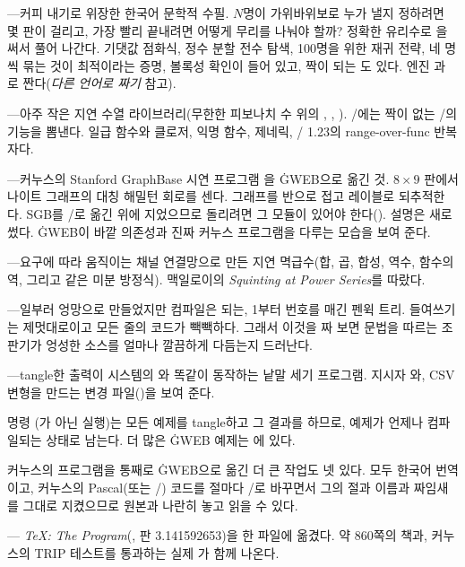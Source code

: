 \bull {}---커피 내기로 위장한 한국어 문학적 수필. $N$명이 가위바위보로
누가 낼지 정하려면 몇 판이 걸리고, 가장 빨리 끝내려면 어떻게 무리를 나눠야
할까? 정확한 유리수로 을 써서 풀어 나간다. 기댓값 점화식, 정수
분할 전수 탐색, 100명을 위한 재귀 전략, 네 명씩 묶는 것이 최적이라는 증명,
볼록성 확인이 들어 있고, 짝이 되는 도 있다. 엔진 과
로 짠다({\it 다른 언어로 짜기\/} 참고).

\bull {}---아주 작은 지연 수열 라이브러리(무한한 피보나치 수 위의
, , ). \CEE/에는 짝이 없는 \GO/의 기능을 뽐낸다.
일급 함수와 클로저, 익명 함수, 제네릭, \GO/ 1.23의 range-over-func
반복자다.

\bull {}---커누스의 Stanford GraphBase 시연 프로그램 을
\.{GWEB}으로 옮긴 것. $8\times9$ 판에서 나이트 그래프의 대칭 해밀턴 회로를
센다. 그래프를 반으로 접고  레이블로 되추적한다. SGB를 \GO/로 옮긴
 위에 지었으므로 돌리려면 그
모듈이 있어야 한다(). 설명은 새로 썼다.
\.{GWEB}이 바깥 의존성과 진짜 커누스 프로그램을 다루는 모습을 보여 준다.

\bull {}---요구에 따라 움직이는 채널 연결망으로 만든 지연 멱급수(합,
곱, 합성, 역수, 함수의 역, 그리고  같은 미분 방정식). 맥일로이의
{\it Squinting at Power Series\/}를 따랐다.

\bull {}---일부러 엉망으로 만들었지만 컴파일은 되는, 1부터
번호를 매긴 펜윅 트리. 들여쓰기는 제멋대로이고 모든 줄의 코드가 빽빽하다.
그래서 이것을 짜 보면 문법을 따르는 조판기가 엉성한 소스를 얼마나 깔끔하게
다듬는지 드러난다.

\bull {}---tangle한 출력이 시스템의 와 똑같이 동작하는 낱말 세기
프로그램. 지시자 와, CSV 변형을 만드는 변경 파일()을 보여 준다.

\noindent 명령 (가 아닌 실행)는 모든 예제를 tangle하고
그 결과를 하므로, 예제가 언제나 컴파일되는 상태로 남는다. 더 많은
\.{GWEB} 예제는 에
있다.

\noindent 커누스의 프로그램을 통째로 \.{GWEB}으로 옮긴 더 큰 작업도 넷 있다.
모두 한국어 번역이고, 커누스의 Pascal(또는 \CEE/) 코드를 절마다 \GO/로 바꾸면서
그의 절과 이름과 짜임새를 그대로 지켰으므로 원본과 나란히 놓고 읽을 수 있다.

\bull {}---{\it
\TeX: The Program\/}(, 판 3.141592653)을  한 파일에 옮겼다.
약 860쪽의 책과, 커누스의 TRIP 테스트를 통과하는 실제 가 함께 나온다.

